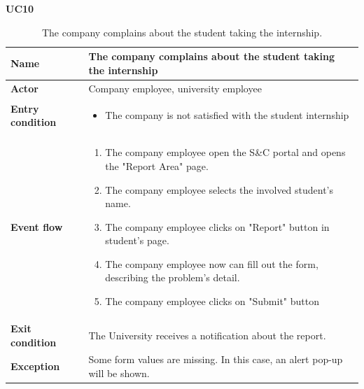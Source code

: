     \textbf{UC10}
    
    \begin{table}[H]
        \centering
        \begin{tabular}{|l|p{11.9cm}|}
        \hline
        \textbf{Name}            & The company complains about the student taking the internship \\\hline
        \textbf{Actor}           & Company employee, university employee    \\\hline
        \textbf{Entry condition} &
        \begin{itemize}
              \item The company is not satisfied with the student internship
        \end{itemize}                                        \\\hline
        \textbf{Event flow}      &
        \begin{enumerate}[label=\arabic*.]
              \item The company employee open the S\&C portal and opens the "Report Area" page.
              \item The company employee selects the involved student's name.
              \item The company employee clicks on "Report" button in student's page.
              \item The company employee now can fill out the form, describing the problem's detail.
              \item The company employee clicks on "Submit" button
        \end{enumerate}            \\\hline
        \textbf{Exit condition}  & The University receives a notification about the report.\\\hline
        \textbf{Exception}       &  Some form values are missing. In this case, an alert pop-up will be shown.\\\hline
        \end{tabular}
        \caption{The company complains about the student taking the internship.}
        \label{table:The company complains about the student taking the internship}
    \end{table}

